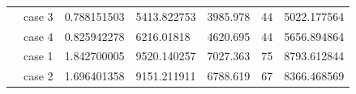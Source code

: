 \begin{table}[]
\begin{tabular}{cllllll}
    \rowcolor[HTML]{FFFFC7} 
    \cellcolor[HTML]{FFFFC7}                                                                                               & case 3                  & 0.788151503                                                                            & 5413.822753                                                                               & 3985.978                                                                            & 44                                                                         & 5022.177564                                                                                \\ \cline{2-7} 
    \rowcolor[HTML]{FFFFC7} 
    \multirow{-4}{*}{\cellcolor[HTML]{FFFFC7}250}                                                                          & case 4                  & 0.825942278                                                                            & 6216.01818                                                                                & 4620.695                                                                            & 44                                                                         & 5656.894864                                                                                \\ \hline
    \rowcolor[HTML]{FFFFC7} 
    \cellcolor[HTML]{FFFFC7}                                                                                               & case 1                  & 1.842700005                                                                            & 9520.140257                                                                               & 7027.363                                                                            & 75                                                                         & 8793.612844                                                                                \\ \cline{2-7} 
    \rowcolor[HTML]{FFFFC7} 
    \cellcolor[HTML]{FFFFC7}                                                                                               & case 2                  & 1.696401358                                                                            & 9151.211911                                                                               & 6788.619                                                                            & 67                                                                         & 8366.468569                                                                                \\ \cline{2-7} 

\end{tabular}
\end{table}
